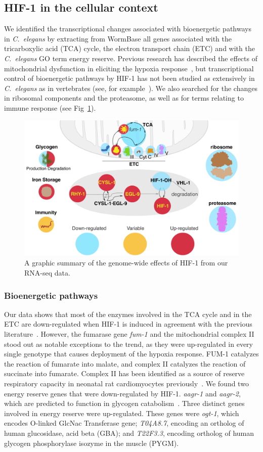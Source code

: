 \documentclass[10pt, onecolumn]{article}
\newcommand{\cel}{\emph{C.~elegans}}
\newcommand{\gene}[1]{\emph{#1}}
\newcommand{\hifp}{HIF-1}
\begin{document}
\subsection*{\hifp{} in the cellular context}
\label{sub:metabolism}

We identified the transcriptional changes
associated with bioenergetic pathways in \cel{} by extracting from
WormBase all genes associated with the tricarboxylic acid (TCA) cycle, the
electron transport chain (ETC) and with the \cel{} GO term energy reserve.
Previous research has described the effects of mitochondrial dysfunction in
eliciting the hypoxia response~\cite{Lee2010}, but transcriptional control
of bioenergetic pathways by \hifp{} has not been studied as extensively in \cel{}
as in vertebrates (see, for example~\cite{Semenza1994,Semenza2012}).
We also searched for the changes in ribosomal components and the proteasome, as
well as for terms relating to immune response (see Fig~\ref{fig:genomewide}).

\begin{figure}[tbhp]
\centering
\includegraphics[width=.7\linewidth]{../figs/hif1genomewide.pdf}
\caption{
A graphic summary of the genome-wide effects of \hifp{} from our RNA-seq data.
}
\label{fig:genomewide}
\end{figure}

\subsubsection*{Bioenergetic pathways}
Our data shows that most of the enzymes involved in the TCA cycle and in the ETC
are down-regulated when \hifp{} is induced in agreement with the previous
literature~\cite{Semenza2012}.
However, the fumarase gene \gene{fum-1} and the mitochondrial complex II stood out
as notable exceptions to the trend, as they were up-regulated in every single
genotype that causes deployment of the hypoxia response. FUM-1 catalyzes the
reaction of fumarate into malate, and complex II catalyzes the reaction of
succinate into fumarate. Complex II has been identified as a source of reserve
respiratory capacity in neonatal rat cardiomyocytes previously~\cite{Pfleger2015}.
We found two energy reserve genes that were down-regulated by \hifp{}.
\gene{aagr-1} and \gene{aagr-2}, which are predicted to function in glycogen
catabolism~\cite{Sikora2010}.
Three distinct genes involved in energy reserve were up-regulated. These genes were
\gene{ogt-1}, which encodes O-linked GlcNac Transferase gene; \gene{T04A8.7},
encoding an ortholog of human glucosidase, acid beta (GBA); and \gene{T22F3.3},
encoding ortholog of human glycogen phosphorylase isozyme in the muscle (PYGM).
\end{document}
